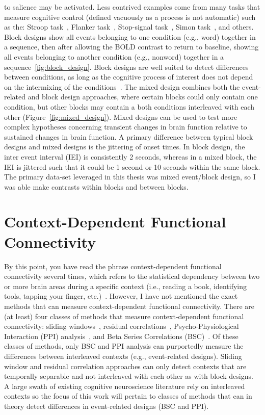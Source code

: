 \documentclass[phd,figures,tables,ackpage,abstractpage,publicabstractpage]{uithesis}
\begin{document}
to salience may be activated.
Less contrived examples come from many tasks that measure cognitive control (defined vacuously
as a process is not automatic) such as the: Stroop task~\cite{Stroop1935},
Flanker task~\cite{Eriksen1974a}, Stop-signal task~\cite{Logan1982},
Simon task~\cite{Simon1963}, and others.
Block designs show all events belonging to one condition (e.g., word) together in a sequence,
then after allowing the BOLD contrast to return to baseline, showing all events belonging
to another condition (e.g., nonword) together in a sequence~\ref{fig:block_design}.
Block designs are well suited to detect differences between conditions, as long as the cognitive process of interest
does not depend on the intermixing of the conditions~\cite{Friston1999}.
The mixed design combines both the event-related and block design approaches, where certain blocks
could only contain one condition, but
other blocks may contain a both conditions interleaved with each other (Figure~\ref{fig:mixed_design}).
Mixed designs can be used to test more complex hypotheses concerning transient changes in brain function
relative to sustained changes in brain function.
A primary difference between typical block designs and mixed designs is the jittering of onset times.
In block design, the inter event interval (IEI) is consistently 2 seconds, whereas
in a mixed block, the IEI is jittered such that it could be 1 second or 10 seconds within the same block.
The primary data-set leveraged in this thesis was mixed event/block design, so I was
able make contrasts within blocks and between blocks.

\section{Context-Dependent Functional Connectivity}

By this point, you have read the phrase context-dependent functional connectivity several times,
which refers to the statistical dependency between two or more brain areas during a specific context
(i.e., reading a book, identifying tools, tapping your finger, etc.)~\cite{Friston1997}.
However, I have not mentioned the exact methods that can measure context-dependent functional connectivity.
There are (at least) four classes of methods that measure context-dependent functional connectivity:
sliding windows~\cite{Shine2015}, residual correlations~\cite{Cole2014a},
Psycho-Physiological Interaction (PPI) analysis~\cite{Friston1997}, and Beta Series Correlations (BSC)~\cite{Rissman2004}.
Of these classes of methods, only BSC and PPI analysis can purportedly measure the differences
between interleaved contexts (e.g., event-related designs).
Sliding window and residual correlation approaches can only detect contexts that are
temporally separable and not interleaved with each other as with block designs.
A large swath of existing cognitive neuroscience literature rely on interleaved
contexts so the focus of this work will pertain to classes of methods
that can in theory detect differences in event-related designs (BSC and PPI).
\end{document}
